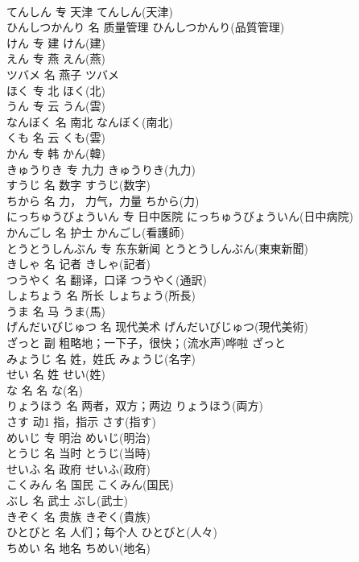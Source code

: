 \documentclass[8pt]{extreport}
\begin{document}
\begin{CJK}{UTF8}{min}
\\	てんしん	专	天津	てんしん(天津)	
\\	ひんしつかんり	名	质量管理	ひんしつかんり(品質管理)	
\\	けん	专	建	けん(建)	
\\	えん	专	燕	えん(燕)	
\\	ツバメ	名	燕子	ツバメ	
\\	ほく	专	北	ほく(北)	
\\	うん	专	云	うん(雲)	
\\	なんぼく	名	南北	なんぼく(南北)	
\\	くも	名	云	くも(雲)	
\\	かん	专	韩	かん(韓)	
\\	きゅうりき	专	九力	きゅうりき(九力)	
\\	すうじ	名	数字	すうじ(数字)	
\\	ちから	名	力， 力气，力量	ちから(力)	
\\	にっちゅうびょういん	专	日中医院	にっちゅうびょういん(日中病院)	
\\	かんごし	名	护士	かんごし(看護師)	
\\	とうとうしんぶん	专	东东新闻	とうとうしんぶん(東東新聞)	
\\	きしゃ	名	记者	きしゃ(記者)	
\\	つうやく	名	翻译，口译	つうやく(通訳)	
\\	しょちょう	名	所长	しょちょう(所長)	
\\	うま	名	马	うま(馬)	
\\	げんだいびじゅつ	名	现代美术	げんだいびじゅつ(現代美術)	
\\	ざっと	副	粗略地；一下子，很快；(流水声)哗啦	ざっと	
\\	みょうじ	名	姓，姓氏	みょうじ(名字)	
\\	せい	名	姓	せい(姓)	
\\	な	名	名	な(名)	
\\	りょうほう	名	两者，双方；两边	りょうほう(両方)	
\\	さす	动1	指，指示	さす(指す)	
\\	めいじ	专	明治	めいじ(明治)	
\\	とうじ	名	当时	とうじ(当時)	
\\	せいふ	名	政府	せいふ(政府)	
\\	こくみん	名	国民	こくみん(国民)	
\\	ぶし	名	武士	ぶし(武士)	
\\	きぞく	名	贵族	きぞく(貴族)	
\\	ひとびと	名	人们；每个人	ひとびと(人々)	
\\	ちめい	名	地名	ちめい(地名)	

\end{CJK}
\end{document}
